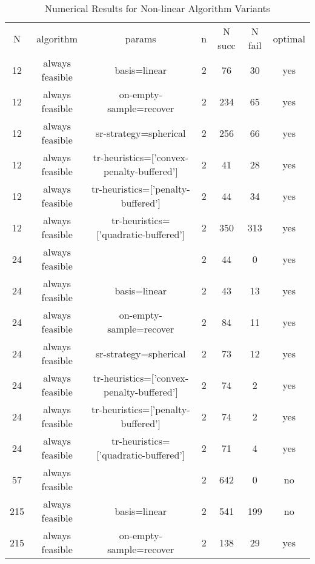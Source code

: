 \begin{scriptsize}
\begin{center}
\begin{longtable}{ccccccc}
\caption{Numerical Results for Non-linear Algorithm Variants} \\
\label{nonlinear_variants_results}
  N &       algorithm &                                    params & n & N succ & N fail & optimal\\
 12 & always feasible &                              basis=linear & 2 &     76 &     30 &     yes\\
 12 & always feasible &                   on-empty-sample=recover & 2 &    234 &     65 &     yes\\
 12 & always feasible &                     sr-strategy=spherical & 2 &    256 &     66 &     yes\\
 12 & always feasible & tr-heuristics=['convex-penalty-buffered'] & 2 &     41 &     28 &     yes\\
 12 & always feasible &        tr-heuristics=['penalty-buffered'] & 2 &     44 &     34 &     yes\\
 12 & always feasible &      tr-heuristics=['quadratic-buffered'] & 2 &    350 &    313 &     yes\\
 24 & always feasible &                                           & 2 &     44 &      0 &     yes\\
 24 & always feasible &                              basis=linear & 2 &     43 &     13 &     yes\\
 24 & always feasible &                   on-empty-sample=recover & 2 &     84 &     11 &     yes\\
 24 & always feasible &                     sr-strategy=spherical & 2 &     73 &     12 &     yes\\
 24 & always feasible & tr-heuristics=['convex-penalty-buffered'] & 2 &     74 &      2 &     yes\\
 24 & always feasible &        tr-heuristics=['penalty-buffered'] & 2 &     74 &      2 &     yes\\
 24 & always feasible &      tr-heuristics=['quadratic-buffered'] & 2 &     71 &      4 &     yes\\
 57 & always feasible &                                           & 2 &    642 &      0 &      no\\
215 & always feasible &                              basis=linear & 2 &    541 &    199 &      no\\
215 & always feasible &                   on-empty-sample=recover & 2 &    138 &     29 &     yes\\

\end{longtable}
\end{center}
\end{scriptsize}
